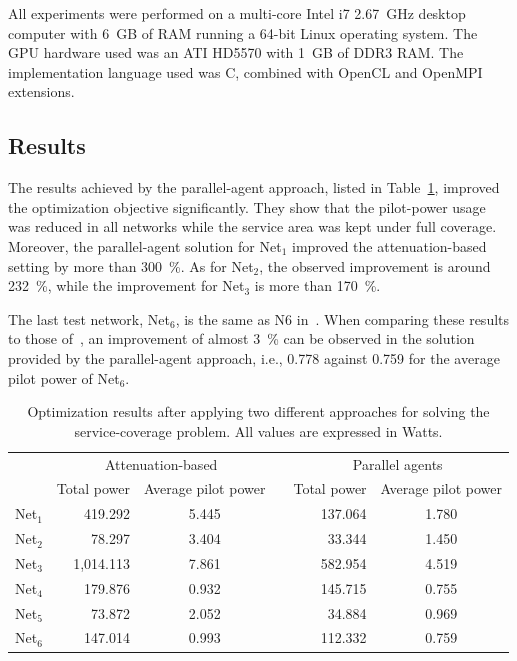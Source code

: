 \bigskip{}


All experiments were performed on a multi-core Intel i7 2.67~GHz
desktop computer with 6~GB of RAM running a 64-bit Linux operating
system. The GPU hardware used was an ATI HD5570 with 1~GB of DDR3
RAM. The implementation language used was C, combined with OpenCL
and OpenMPI extensions.


\subsection{Results}

The results achieved by the parallel-agent approach, listed in Table~\ref{tab:06-Optimization_results},
improved the optimization objective significantly. They show that
the pilot-power usage was reduced in all networks while the service
area was kept under full coverage. Moreover, the parallel-agent solution
for Net$_{1}$ improved the attenuation-based setting by more than
300~\%. As for Net$_{2}$, the observed improvement is around 232~\%,
while the improvement for Net$_{3}$ is more than 170~\%. 

The last test network, Net$_{6}$, is the same as N6 in~\cite{Siomina:Minimum.pilot.power.for.service.coverage}.
When comparing these results to those of~\cite{Siomina:Minimum.pilot.power.for.service.coverage},
an improvement of almost 3~\% can be observed in the solution provided
by the parallel-agent approach, i.e., 0.778 against 0.759 for the
average pilot power of Net$_{6}$.

\begin{table}
\caption{Optimization results after applying two different approaches for solving
the service-coverage problem. All values are expressed in Watts.\emph{\label{tab:06-Optimization_results}}}


\centering

\begin{tabular}{crccrc}
\cmidrule{2-6} 
 & \multicolumn{2}{c}{Attenuation-based} &  & \multicolumn{2}{c}{Parallel agents}\tabularnewline\addlinespace
\cmidrule{2-3} \cmidrule{5-6} 
 & Total power & Average pilot power &  & Total power & Average pilot power\tabularnewline\addlinespace
\cmidrule{1-3} \cmidrule{5-6} 
Net$_{1}$ & 419.292 & 5.445 &  & 137.064 & 1.780\tabularnewline
Net$_{2}$ & 78.297 & 3.404 &  & 33.344 & 1.450\tabularnewline
Net$_{3}$ & 1,014.113 & 7.861 &  & 582.954 & 4.519\tabularnewline
Net$_{4}$ & 179.876 & 0.932 &  & 145.715 & 0.755\tabularnewline
Net$_{5}$ & 73.872 & 2.052 &  & 34.884 & 0.969\tabularnewline
Net$_{6}$ & 147.014 & 0.993 &  & 112.332 & 0.759\tabularnewline
\bottomrule
\end{tabular}
\end{table}




